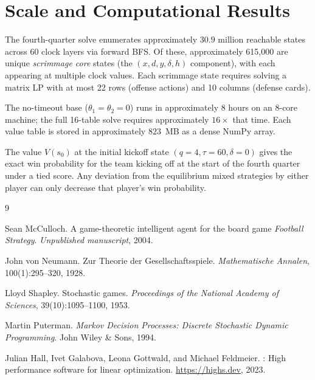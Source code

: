 \documentclass[11pt,letterpaper]{article}
\begin{document}
\section{Scale and Computational Results}
\label{sec:results}

The fourth-quarter solve enumerates approximately $30.9$ million reachable states across 60
clock layers via forward BFS.  Of these, approximately 615,000 are unique
\emph{scrimmage core} states (the $(x,d,y,\delta,h)$ component), with each appearing at
multiple clock values.  Each scrimmage state requires solving a matrix LP with at most 22
rows (offense actions) and 10 columns (defense cards).

The no-timeout base ($\theta_1=\theta_2=0$) runs in approximately 8 hours on an
8-core machine; the full 16-table solve requires approximately $16\times$ that time.
Each value table is stored in approximately $823$~MB as a dense NumPy array.

The value $V(s_0)$ at the initial kickoff state $(q=4,\tau=60,\delta=0)$ gives the exact
win probability for the team kicking off at the start of the fourth quarter under a tied
score.  Any deviation from the equilibrium mixed strategies by either player can only
decrease that player's win probability.

\begin{thebibliography}{9}

Sean McCulloch.
\newblock A game-theoretic intelligent agent for the board game \emph{Football
  Strategy}.
\newblock \emph{Unpublished manuscript}, 2004.

John von Neumann.
\newblock Zur Theorie der Gesellschaftsspiele.
\newblock \emph{Mathematische Annalen}, 100(1):295--320, 1928.

Lloyd Shapley.
\newblock Stochastic games.
\newblock \emph{Proceedings of the National Academy of Sciences}, 39(10):1095--1100, 1953.

Martin Puterman.
\newblock \emph{Markov Decision Processes: Discrete Stochastic Dynamic Programming}.
\newblock John Wiley \& Sons, 1994.

Julian Hall, Ivet Galabova, Leona Gottwald, and Michael Feldmeier.
: High performance software for linear optimization.
\newblock \url{https://highs.dev}, 2023.

\end{thebibliography}
\end{document}
